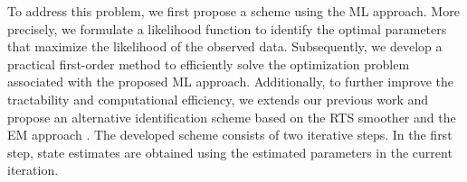 %
To address this problem, we first propose a scheme using the ML approach. 
%
More precisely, we formulate a likelihood function to identify the optimal parameters that maximize the likelihood of the observed data. 
%
Subsequently, we develop a practical first-order method to efficiently solve the optimization problem associated with the proposed ML approach. 
%
Additionally, to further improve the tractability and computational efficiency, we extends our previous work \cite{liu2024system} and propose an alternative identification scheme based on the RTS smoother \cite{rauch1965maximum} and the EM approach \cite{dempster1977maximum}.
%
The developed scheme consists of two iterative steps. 
%
In the first step, state estimates are obtained using the estimated parameters in the current iteration. 
%
